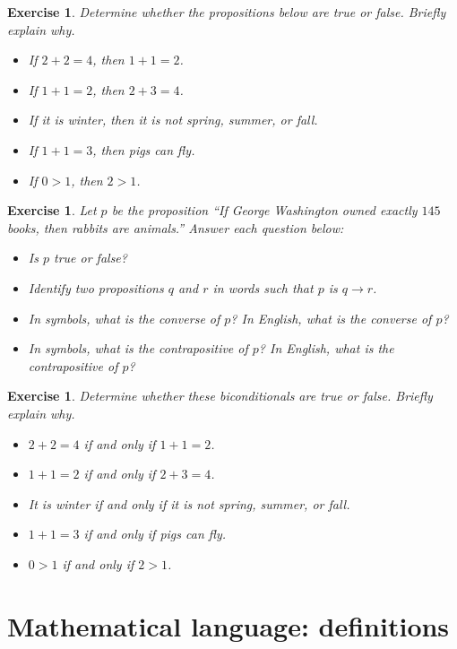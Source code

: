 \documentclass{book}
\newcounter{ekcounter}%
\theoremstyle{ekimcustom}
\newtheorem{exercise}[ekcounter]{Exercise}
\begin{document}
\begin{exercise}
Determine whether the propositions below are true or false. Briefly explain why.
\begin{itemize}
\item If $2+2=4$, then $1+1=2$.
\item If $1+1=2$, then $2+3=4$.
\item If it is winter, then it is not spring, summer, or fall.
\item If $1+1=3$, then pigs can fly.
\item If $0 > 1$, then $2 > 1$.
\end{itemize}
\end{exercise}

\begin{exercise}
Let $p$ be the proposition ``If George Washington owned exactly $145$ books, then rabbits are animals.'' Answer each question below: 
\begin{itemize}
\item Is $p$ true or false?
\item Identify two propositions $q$ and $r$ in words such that $p$ is $q \rightarrow r$.
\item In symbols, what is the converse of $p$? In English, what is the converse of $p$?
\item In symbols, what is the contrapositive of $p$? In English, what is the contrapositive of $p$?
\end{itemize}
\end{exercise}

\begin{exercise}
Determine whether these biconditionals are true or false. Briefly explain why.
\begin{itemize}
\item $2+2=4$ if and only if $1+1=2$.
\item $1+1=2$ if and only if $2+3=4$.
\item It is winter if and only if it is not spring, summer, or fall.
\item $1+1=3$ if and only if pigs can fly.
\item $0 > 1$ if and only if $2 > 1$.
\end{itemize}
\end{exercise}

\section{Mathematical language: definitions}
\end{document}
